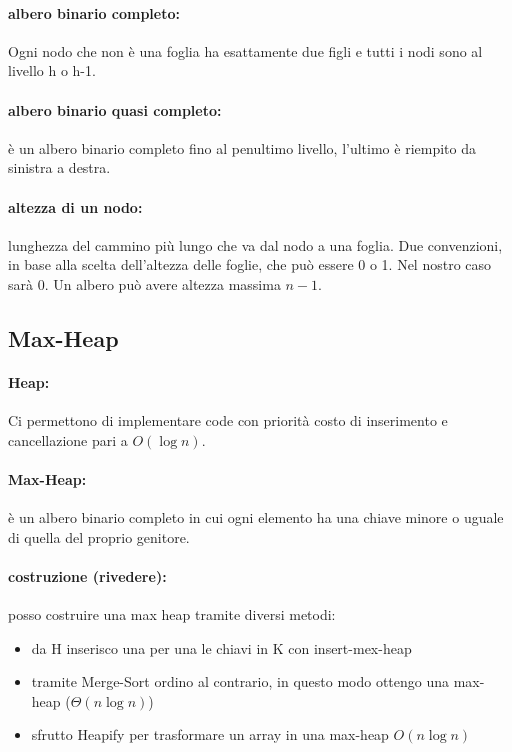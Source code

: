 \documentclass{article}
\begin{document}
\paragraph{albero binario completo:} Ogni nodo che non è una foglia ha esattamente due figli e tutti i 
nodi sono al livello h o h-1.

\paragraph{albero binario quasi completo:} è un albero binario completo fino al penultimo livello, l'ultimo è 
riempito da sinistra a destra.

\paragraph{altezza di un nodo:} lunghezza del cammino più lungo che va dal nodo a una foglia. Due convenzioni, in base
alla scelta dell'altezza delle foglie, che può essere 0 o 1. Nel nostro caso sarà 0. 
Un albero può avere altezza massima $n-1$.



\subsection{Max-Heap} %
\paragraph{Heap:} Ci permettono di implementare code con priorità costo di inserimento e cancellazione pari a $O(\log n)$.

\paragraph{Max-Heap:} è un albero binario completo in cui ogni elemento ha una chiave minore o uguale di quella 
del proprio genitore.

\paragraph{costruzione (rivedere):} posso costruire una max heap tramite diversi metodi:
\begin{itemize}
    \item da H inserisco una per una le chiavi in K con insert-mex-heap
    \item tramite Merge-Sort ordino al contrario, in questo modo ottengo una max-heap ($\Theta(n \log n)$)
    \item sfrutto Heapify per trasformare un array in una max-heap $O(n \log n)$
\end{itemize}
\end{document}
